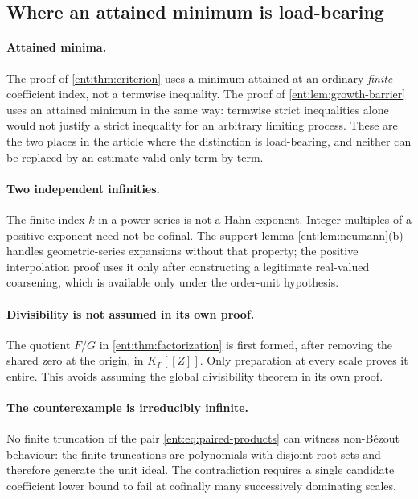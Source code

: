 \documentclass[11pt]{article}
\theoremstyle{plain}
\theoremstyle{plain}
\theoremstyle{plain}
\theoremstyle{definition}
\theoremstyle{definition}
\theoremstyle{definition}
\theoremstyle{definition}
\theoremstyle{remark}
\newcommand{\K}{K_\Gamma}\newcommand{\KD}{K_\Delta}
\begin{document}
\subsection{Where an attained minimum is load-bearing}
\paragraph{Attained minima.}
The proof of \cref{ent:thm:criterion} uses a minimum attained at an ordinary
\emph{finite} coefficient index, not a termwise inequality. The proof of
\cref{ent:lem:growth-barrier} uses an attained minimum in the same way:
termwise strict inequalities alone would not justify a strict inequality for
an arbitrary limiting process. These are the two places in the article where
the distinction is load-bearing, and neither can be replaced by an estimate
valid only term by term.

\paragraph{Two independent infinities.}
The finite index $k$ in a power series is not a Hahn exponent. Integer
multiples of a positive exponent need not be cofinal. The support lemma
\cref{ent:lem:neumann}(b) handles geometric-series expansions without that
property; the positive interpolation proof uses it only after constructing a
legitimate real-valued coarsening, which is available only under the
order-unit hypothesis.

\paragraph{Divisibility is not assumed in its own proof.}
The quotient $F/G$ in \cref{ent:thm:factorization} is first formed, after
removing the shared zero at the origin, in $\K[[Z]]$. Only preparation at
every scale proves it entire. This avoids assuming the global divisibility
theorem in its own proof.

\paragraph{The counterexample is irreducibly infinite.}
No finite truncation of the pair \eqref{ent:eq:paired-products} can witness
non-B\'ezout behaviour: the finite truncations are polynomials with disjoint
root sets and therefore generate the unit ideal. The contradiction requires a
single candidate coefficient lower bound to fail at cofinally many
successively dominating scales.
\end{document}
